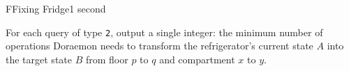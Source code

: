 \begin{problem}{F}{Fixing Fridge}{1 second}
\OutputFile

\noindent
For each query of type \texttt{2}, output a single integer: the minimum number of operations Doraemon needs to transform the refrigerator's current state $A$ into the target state $B$ from floor $p$ to $q$ and compartment $x$ to $y$.

\Examples

\begin{example}

\end{example}

\pagebreak

\end{problem}
